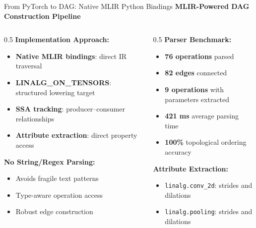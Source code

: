 \documentclass[10pt,aspectratio=169]{beamer}
\begin{document}
\begin{frame}{From PyTorch to DAG: Native MLIR Python Bindings}
\centering
\textbf{MLIR-Powered DAG Construction Pipeline}
\vspace{0.25cm}
\begin{columns}
\begin{column}{0.5\textwidth}
\textbf{Implementation Approach:}
\begin{itemize}
\small
\item \textcolor{edgegreen}{\textbf{Native MLIR bindings}}: direct IR traversal
\item \textcolor{edgegreen}{\textbf{LINALG\_ON\_TENSORS}}: structured lowering target
\item \textcolor{edgegreen}{\textbf{SSA tracking}}: producer--consumer relationships
\item \textcolor{edgegreen}{\textbf{Attribute extraction}}: direct property access
\end{itemize}

\vspace{0.15cm}
\textbf{No String/Regex Parsing:}
\begin{itemize}
\small
\item Avoids fragile text patterns
\item Type-aware operation access
\item Robust edge construction
\end{itemize}
\end{column}

\begin{column}{0.5\textwidth}
\textbf{Parser Benchmark:}
\begin{itemize}
\small
\item \textbf{76 operations} parsed
\item \textbf{82 edges} connected
\item \textbf{9 operations} with parameters extracted
\item \textbf{421 ms} average parsing time
\item \textbf{100\%} topological ordering accuracy
\end{itemize}

\vspace{0.15cm}
\textbf{Attribute Extraction:}
\begin{itemize}
\tiny
\item \texttt{linalg.conv\_2d}: strides and dilations
\item \texttt{linalg.pooling}: strides and dilations
\end{itemize}


\end{column}
\end{columns}
\end{frame}
\end{document}
